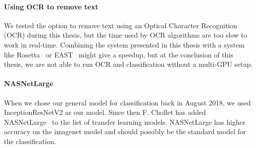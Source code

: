 \paragraph{Using OCR to remove text}
We tested the option to remove text using an Optical Character Recognition (OCR) during this thesis, but the time used by OCR algorithms are too slow to work in real-time. Combining the system presented in this thesis with a system like Rosetta~\cite{borisyuk2018rosetta} or EAST~\cite{DBLP:journals/corr/ZhouYWWZHL17} might give a speedup, but at the conclusion of this thesis, we are not able to run OCR and classification without a multi-GPU setup.


\paragraph{NASNetLarge}
When we chose our general model for classification back in August 2018, we used InceptionResNetV2 as our model. Since then F. Chollet has added NASNetLarge~\cite{DBLP:journals/corr/ZophVSL17} to the list of transfer learning models. NASNetLarge has higher accuracy on the imagenet model and should possibly be the standard model for the classification.


